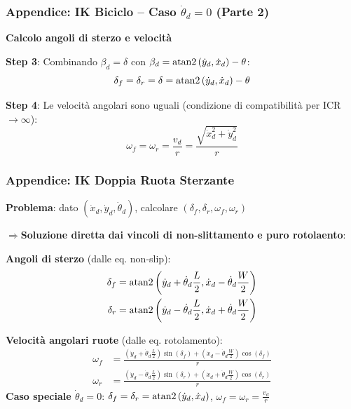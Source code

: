 \begin{frame}
    \frametitle{Appendice: IK Biciclo -- Caso $\dot{\theta}_d = 0$ (Parte 2)}
    \textbf{Calcolo angoli di sterzo e velocità}

    \vspace{0.3cm}

    \textbf{Step 3}: Combinando $\beta_d = \delta$ con $\beta_d = \operatorname{atan2}\left(\dot{y}_d,\dot{x}_d\right) - \theta$:
    \begin{equation}
        \delta_f = \delta_r = \delta = \operatorname{atan2}\left(\dot{y}_d,\dot{x}_d\right) - \theta
    \end{equation}

    \vspace{0.3cm}

    \textbf{Step 4}: Le velocità angolari sono uguali (condizione di compatibilità per ICR $\to \infty$):
    \begin{equation}
        \omega_f = \omega_r = \frac{v_d}{r} = \frac{\sqrt{\dot{x}_d^2 + \dot{y}_d^2}}{r}
    \end{equation}
\end{frame}

\begin{frame}
    \frametitle{Appendice: IK Doppia Ruota Sterzante}
    \textbf{Problema}: dato $(\dot{x}_d, \dot{y}_d, \dot{\theta}_d)$, calcolare $(\delta_f, \delta_r, \omega_f, \omega_r)$

    $\Rightarrow$\textbf{Soluzione diretta dai vincoli di non-slittamento e puro rotolaento}:

    \textbf{Angoli di sterzo} (dalle eq. non-slip):
    \begin{align}
        \delta_f & = \operatorname{atan2}\left(\dot{y}_d + \dot{\theta}_d \frac{L}{2},\dot{x}_d - \dot{\theta}_d \frac{W}{2}\right) \\
        \delta_r & = \operatorname{atan2}\left(\dot{y}_d - \dot{\theta}_d \frac{L}{2},\dot{x}_d + \dot{\theta}_d \frac{W}{2}\right)
    \end{align}

    \textbf{Velocità angolari ruote} (dalle eq. rotolamento):
    \begin{align}
        \omega_f & = \frac{(\dot{y}_d + \dot{\theta}_d \frac{L}{2}) \sin(\delta_f) + (\dot{x}_d - \dot{\theta}_d \frac{W}{2}) \cos(\delta_f)}{r} \\
        \omega_r & = \frac{(\dot{y}_d - \dot{\theta}_d \frac{L}{2}) \sin(\delta_r) + (\dot{x}_d + \dot{\theta}_d \frac{W}{2}) \cos(\delta_r)}{r}
    \end{align}
    \textbf{Caso speciale $\dot{\theta}_d = 0$}: $\delta_f = \delta_r = \operatorname{atan2}\left(\dot{y}_d,\dot{x}_d\right)$, $\omega_f = \omega_r = \frac{v_d}{r}$
\end{frame}

